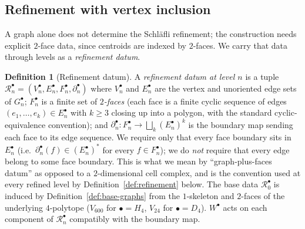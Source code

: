 \documentclass[11pt, a4paper]{amsart}
\theoremstyle{definition}
\newtheorem{definition}[theorem]{Definition}
\begin{document}
\subsection{Refinement with vertex inclusion}

A graph alone does not determine the Schl\"{a}fli refinement; the
construction needs explicit $2$-face data, since centroids are
indexed by $2$-faces. We carry that data through levels as a
\emph{refinement datum}.

\begin{definition}[Refinement datum]
\label{def:refinement-datum}
A \emph{refinement datum at level $n$} is a tuple
$\mathcal{R}_n^\bullet = (V_n^\bullet, E_n^\bullet, F_n^\bullet,
\partial_n^\bullet)$ where $V_n^\bullet$ and $E_n^\bullet$ are
the vertex and unoriented edge sets of $G_n^\bullet$;
$F_n^\bullet$ is a finite set of \emph{$2$-faces} (each face is
a finite cyclic sequence of edges
$(e_1, \ldots, e_k) \in E_n^\bullet$ with $k \ge 3$ closing up
into a polygon, with the standard cyclic-equivalence convention);
and $\partial_n^\bullet \colon F_n^\bullet \to \bigsqcup_k
(E_n^\bullet)^k$ is the boundary map sending each face to its
edge sequence. We require only that every face boundary sits in
$E_n^\bullet$ (i.e.\ $\partial_n^\bullet(f) \in (E_n^\bullet)^*$
for every $f \in F_n^\bullet$); we do \emph{not} require that
every edge belong to some face boundary. This is what we mean by
``graph-plus-faces datum'' as opposed to a $2$-dimensional cell
complex, and is the convention used at every refined level by
Definition~\ref{def:refinement} below. The base data $\mathcal{R}_0^\bullet$ is induced
by Definition~\ref{def:base-graphs} from the $1$-skeleton and
$2$-faces of the underlying $4$-polytope ($V_{600}$ for
$\bullet = H_4$, $V_{24}$ for $\bullet = D_4$). $W^\bullet$ acts
on each component of $\mathcal{R}_n^\bullet$ compatibly with the
boundary map.
\end{definition}
\end{document}
